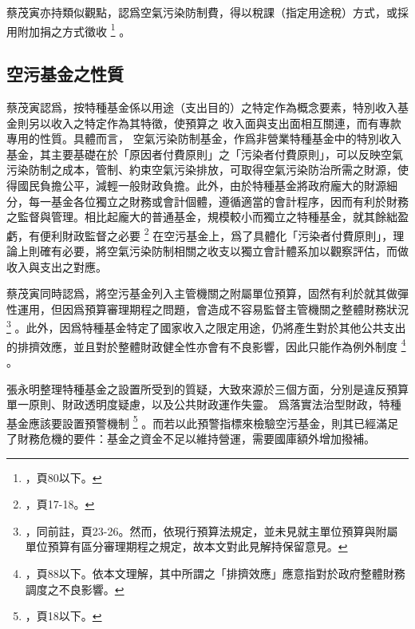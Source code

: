 \documentclass[12pt,a4paper]{article}
\begin{document}
蔡茂寅亦持類似觀點，認爲空氣污染防制費，得以稅課（指定用途稅）方式，或採用附加捐之方式徵收
\footnote{，頁80以下。}
。




\subsection{空污基金之性質}

蔡茂寅認爲，按特種基金係以用途（支出目的）之特定作為概念要素，特別收入基金則另以收入之特定作為其特徵，使預算之 收入面與支出面相互關連，而有專款專用的性質。具體而言，
空氣污染防制基金，作爲非營業特種基金中的特別收入基金，其主要基礎在於「原因者付費原則」之「污染者付費原則」，可以反映空氣污染防制之成本，管制、約束空氣污染排放，可取得空氣污染防治所需之財源，使得國民負擔公平，減輕一般財政負擔。此外，由於特種基金將政府龐大的財源細分，每一基金各位獨立之財務或會計個體，遵循適當的會計程序，因而有利於財務之監督與管理。相比起龐大的普通基金，規模較小而獨立之特種基金，就其餘絀盈虧，有便利財政監督之必要
\footnote{，頁17-18。}
在空污基金上，爲了具體化「污染者付費原則」，理論上則確有必要，將空氣污染防制相關之收支以獨立會計體系加以觀察評估，而做收入與支出之對應。

蔡茂寅同時認爲，將空污基金列入主管機關之附屬單位預算，固然有利於就其做彈性運用，但因爲預算審理期程之問題，會造成不容易監督主管機關之整體財務狀況\footnote{
  ，同前註，頁23-26。然而，依現行預算法規定，並未見就主單位預算與附屬單位預算有區分審理期程之規定，故本文對此見解持保留意見。}
。此外，因爲特種基金特定了國家收入之限定用途，仍將產生對於其他公共支出的排擠效應，並且對於整體財政健全性亦會有不良影響，因此只能作為例外制度
\footnote{，頁88以下。依本文理解，其中所謂之「排擠效應」應意指對於政府整體財務調度之不良影響。}
。


張永明整理特種基金之設置所受到的質疑，大致來源於三個方面，分別是違反預算單一原則、財政透明度疑慮，以及公共財政運作失靈。
爲落實法治型財政，特種基金應該要設置預警機制
\footnote{，頁18以下。}
。而若以此預警指標來檢驗空污基金，則其已經滿足了財務危機的要件：基金之資金不足以維持營運，需要國庫額外增加撥補。
\end{document}
